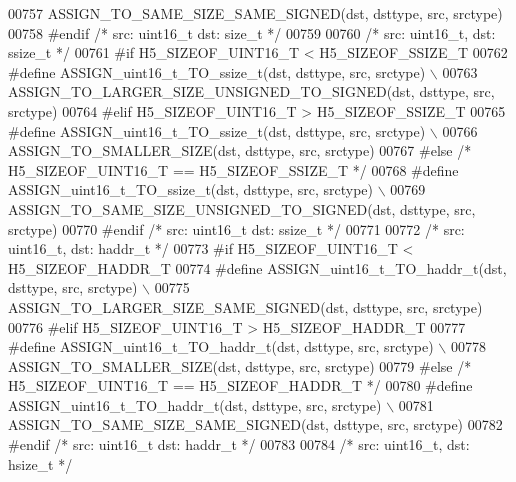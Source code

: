 \begin{DoxyCode}
00757 \textcolor{preprocessor}{        ASSIGN\_TO\_SAME\_SIZE\_SAME\_SIGNED(dst, dsttype, src, srctype)}
00758 \textcolor{preprocessor}{#endif }\textcolor{comment}{/* src: uint16\_t dst: size\_t */}\textcolor{preprocessor}{}
00759 
00760 \textcolor{comment}{/* src: uint16\_t, dst: ssize\_t */}
00761 \textcolor{preprocessor}{#if H5\_SIZEOF\_UINT16\_T < H5\_SIZEOF\_SSIZE\_T}
00762 \textcolor{preprocessor}{    #define ASSIGN\_uint16\_t\_TO\_ssize\_t(dst, dsttype, src, srctype) \(\backslash\)}
00763 \textcolor{preprocessor}{        ASSIGN\_TO\_LARGER\_SIZE\_UNSIGNED\_TO\_SIGNED(dst, dsttype, src, srctype)}
00764 \textcolor{preprocessor}{#elif H5\_SIZEOF\_UINT16\_T > H5\_SIZEOF\_SSIZE\_T}
00765 \textcolor{preprocessor}{    #define ASSIGN\_uint16\_t\_TO\_ssize\_t(dst, dsttype, src, srctype) \(\backslash\)}
00766 \textcolor{preprocessor}{        ASSIGN\_TO\_SMALLER\_SIZE(dst, dsttype, src, srctype)}
00767 \textcolor{preprocessor}{#else }\textcolor{comment}{/* H5\_SIZEOF\_UINT16\_T == H5\_SIZEOF\_SSIZE\_T */}\textcolor{preprocessor}{}
00768 \textcolor{preprocessor}{    #define ASSIGN\_uint16\_t\_TO\_ssize\_t(dst, dsttype, src, srctype) \(\backslash\)}
00769 \textcolor{preprocessor}{        ASSIGN\_TO\_SAME\_SIZE\_UNSIGNED\_TO\_SIGNED(dst, dsttype, src, srctype)}
00770 \textcolor{preprocessor}{#endif }\textcolor{comment}{/* src: uint16\_t dst: ssize\_t */}\textcolor{preprocessor}{}
00771 
00772 \textcolor{comment}{/* src: uint16\_t, dst: haddr\_t */}
00773 \textcolor{preprocessor}{#if H5\_SIZEOF\_UINT16\_T < H5\_SIZEOF\_HADDR\_T}
00774 \textcolor{preprocessor}{    #define ASSIGN\_uint16\_t\_TO\_haddr\_t(dst, dsttype, src, srctype) \(\backslash\)}
00775 \textcolor{preprocessor}{        ASSIGN\_TO\_LARGER\_SIZE\_SAME\_SIGNED(dst, dsttype, src, srctype)}
00776 \textcolor{preprocessor}{#elif H5\_SIZEOF\_UINT16\_T > H5\_SIZEOF\_HADDR\_T}
00777 \textcolor{preprocessor}{    #define ASSIGN\_uint16\_t\_TO\_haddr\_t(dst, dsttype, src, srctype) \(\backslash\)}
00778 \textcolor{preprocessor}{        ASSIGN\_TO\_SMALLER\_SIZE(dst, dsttype, src, srctype)}
00779 \textcolor{preprocessor}{#else }\textcolor{comment}{/* H5\_SIZEOF\_UINT16\_T == H5\_SIZEOF\_HADDR\_T */}\textcolor{preprocessor}{}
00780 \textcolor{preprocessor}{    #define ASSIGN\_uint16\_t\_TO\_haddr\_t(dst, dsttype, src, srctype) \(\backslash\)}
00781 \textcolor{preprocessor}{        ASSIGN\_TO\_SAME\_SIZE\_SAME\_SIGNED(dst, dsttype, src, srctype)}
00782 \textcolor{preprocessor}{#endif }\textcolor{comment}{/* src: uint16\_t dst: haddr\_t */}\textcolor{preprocessor}{}
00783 
00784 \textcolor{comment}{/* src: uint16\_t, dst: hsize\_t */}

\end{DoxyCode}
